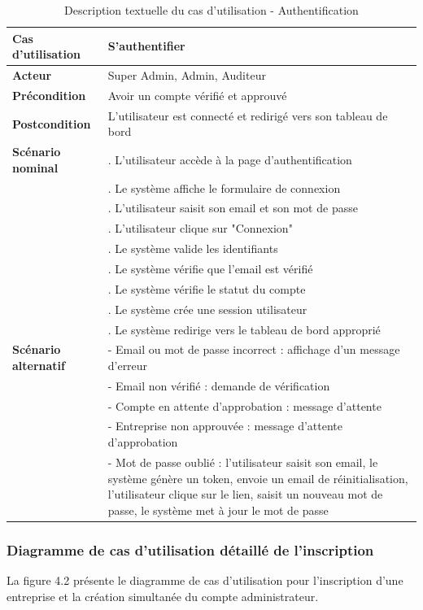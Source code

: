 \begin{longtable}{|>{\raggedright\arraybackslash}p{4cm}|>{\raggedright\arraybackslash}p{9cm}|}
\caption{Description textuelle du cas d'utilisation - Authentification}
\label{tab:auth_usecase} \\
\hline
\textbf{Cas d'utilisation} & \textbf{S'authentifier} \\
\hline
\textbf{Acteur} & Super Admin, Admin, Auditeur \\
\hline
\textbf{Précondition} & Avoir un compte vérifié et approuvé \\
\hline
\textbf{Postcondition} & L'utilisateur est connecté et redirigé vers son tableau de bord \\
\hline
\textbf{Scénario nominal} & 
1. L'utilisateur accède à la page d'authentification \\
& 2. Le système affiche le formulaire de connexion \\
& 3. L'utilisateur saisit son email et son mot de passe \\
& 4. L'utilisateur clique sur "Connexion" \\    
& 5. Le système valide les identifiants \\
& 6. Le système vérifie que l'email est vérifié \\
& 7. Le système vérifie le statut du compte \\
& 8. Le système crée une session utilisateur \\
& 9. Le système redirige vers le tableau de bord approprié \\
\hline
\textbf{Scénario alternatif} & 
- Email ou mot de passe incorrect : affichage d'un message d'erreur \\
& - Email non vérifié : demande de vérification \\
& - Compte en attente d'approbation : message d'attente \\
& - Entreprise non approuvée : message d'attente d'approbation \\
& - Mot de passe oublié : l'utilisateur saisit son email, le système génère un token, envoie un email de réinitialisation, l'utilisateur clique sur le lien, saisit un nouveau mot de passe, le système met à jour le mot de passe \\
\hline
\end{longtable}
\subsubsection{Diagramme de cas d'utilisation détaillé de l'inscription}
\noindent La figure 4.2 présente le diagramme de cas d'utilisation pour l'inscription d'une entreprise et la création simultanée du compte administrateur.


